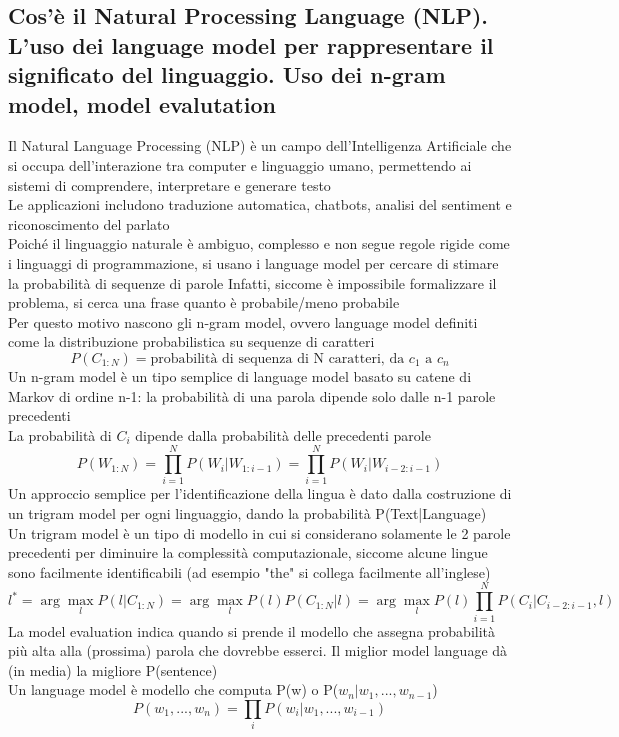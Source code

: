 \documentclass[10pt,oneside,a4paper]{article}
\begin{document}
	\subsection{Cos'è il Natural Processing Language (NLP). L'uso dei language model per rappresentare il significato del linguaggio. Uso dei n-gram model, model evalutation}
	Il Natural Language Processing (NLP) è un campo dell'Intelligenza Artificiale che si occupa dell'interazione tra computer e linguaggio umano, permettendo ai sistemi di comprendere, interpretare e generare testo\\
	Le applicazioni includono traduzione automatica, chatbots, analisi del sentiment e riconoscimento del parlato\\
	Poiché il linguaggio naturale è ambiguo, complesso e non segue regole rigide come i linguaggi di programmazione, si usano i language model per cercare di stimare la probabilità di sequenze di parole
	Infatti, siccome è impossibile formalizzare il problema, si cerca una frase quanto è probabile/meno probabile\\
	Per questo motivo nascono gli n-gram model, ovvero language model definiti come la distribuzione probabilistica su sequenze di caratteri\\
	\[
		P(C_{1:N}) = \text{probabilità di sequenza di N caratteri, da }c_1 \text{ a }c_n
	\]
	Un n-gram model è un tipo semplice di language model basato su catene di Markov di ordine n-1: la probabilità di una parola dipende solo dalle n-1 parole precedenti\\
	La probabilità di $C_i$ dipende dalla probabilità delle precedenti parole
	\[
		P(W_{1:N}) = \prod_{i=1}^{N}P(W_i | W_{1:i-1}) = \prod_{i=1}^{N}P(W_i | W_{i-2:i-1})
	\]
	Un approccio semplice per l'identificazione della lingua è dato dalla costruzione di un trigram model per ogni linguaggio, dando la probabilità P(Text|Language)\\
	Un trigram model è un tipo di modello in cui si considerano solamente le 2 parole precedenti per diminuire la complessità computazionale, siccome alcune lingue sono facilmente identificabili (ad esempio "the" si collega facilmente all'inglese)
	\[
		l^* = \arg\max_l P(l|C_{1:N}) = \arg\max_l P(l) P(C_{1:N}|l) = \arg\max_l P(l) \prod_{i=1}^{N} P(C_i | C_{i-2:i-1},l)
	\]
	La model evaluation indica quando si prende il modello che assegna probabilità più alta alla (prossima) parola che dovrebbe esserci. Il miglior model language dà (in media) la migliore P(sentence)\\
	Un language model è modello che computa P(w) o P($w_n | w_1,...,w_{n-1}$)
	\[
		P(w_1,...,w_n) = \prod_{i}P(w_i | w_1,...,w_{i-1})
	\]
	
		
\end{document}
